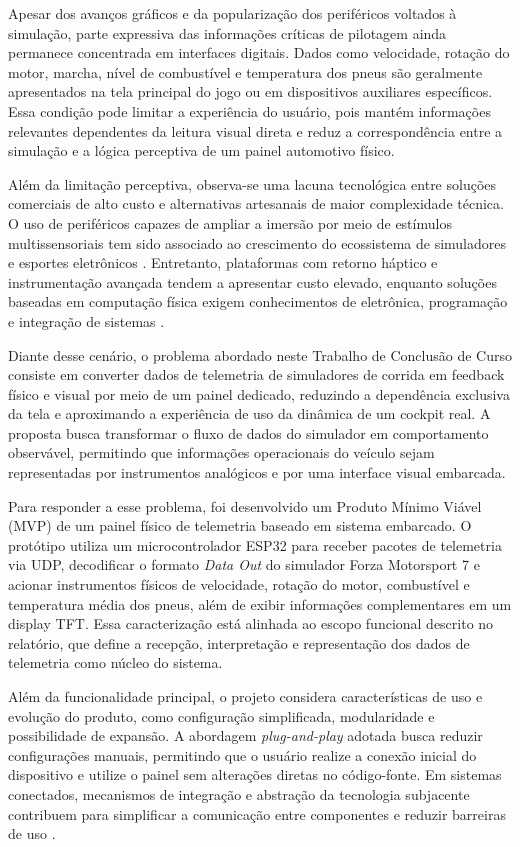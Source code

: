 \documentclass[
  12pt,
  oneside,
  a4paper,
  chapter=TITLE,
  section=TITLE,
  subsection=TITLE,
  brazil
]{abntex2}
\begin{document}
Apesar dos avanços gráficos e da popularização dos periféricos voltados à simulação, parte expressiva das informações críticas de pilotagem ainda permanece concentrada em interfaces digitais. Dados como velocidade, rotação do motor, marcha, nível de combustível e temperatura dos pneus são geralmente apresentados na tela principal do jogo ou em dispositivos auxiliares específicos. Essa condição pode limitar a experiência do usuário, pois mantém informações relevantes dependentes da leitura visual direta e reduz a correspondência entre a simulação e a lógica perceptiva de um painel automotivo físico.

Além da limitação perceptiva, observa-se uma lacuna tecnológica entre soluções comerciais de alto custo e alternativas artesanais de maior complexidade técnica. O uso de periféricos capazes de ampliar a imersão por meio de estímulos multissensoriais tem sido associado ao crescimento do ecossistema de simuladores e esportes eletrônicos \cite{calleo2023}. Entretanto, plataformas com retorno háptico e instrumentação avançada tendem a apresentar custo elevado, enquanto soluções baseadas em computação física exigem conhecimentos de eletrônica, programação e integração de sistemas \cite{defrutos2021,love2022,vergara2025}.

Diante desse cenário, o problema abordado neste Trabalho de Conclusão de Curso consiste em converter dados de telemetria de simuladores de corrida em feedback físico e visual por meio de um painel dedicado, reduzindo a dependência exclusiva da tela e aproximando a experiência de uso da dinâmica de um cockpit real. A proposta busca transformar o fluxo de dados do simulador em comportamento observável, permitindo que informações operacionais do veículo sejam representadas por instrumentos analógicos e por uma interface visual embarcada.

Para responder a esse problema, foi desenvolvido um Produto Mínimo Viável (MVP) de um painel físico de telemetria baseado em sistema embarcado. O protótipo utiliza um microcontrolador ESP32 para receber pacotes de telemetria via UDP, decodificar o formato \textit{Data Out} do simulador Forza Motorsport 7 e acionar instrumentos físicos de velocidade, rotação do motor, combustível e temperatura média dos pneus, além de exibir informações complementares em um display TFT. Essa caracterização está alinhada ao escopo funcional descrito no relatório, que define a recepção, interpretação e representação dos dados de telemetria como núcleo do sistema. 

Além da funcionalidade principal, o projeto considera características de uso e evolução do produto, como configuração simplificada, modularidade e possibilidade de expansão. A abordagem \textit{plug-and-play} adotada busca reduzir configurações manuais, permitindo que o usuário realize a conexão inicial do dispositivo e utilize o painel sem alterações diretas no código-fonte. Em sistemas conectados, mecanismos de integração e abstração da tecnologia subjacente contribuem para simplificar a comunicação entre componentes e reduzir barreiras de uso \cite{alfuqaha2015,roy2019}.
\end{document}
